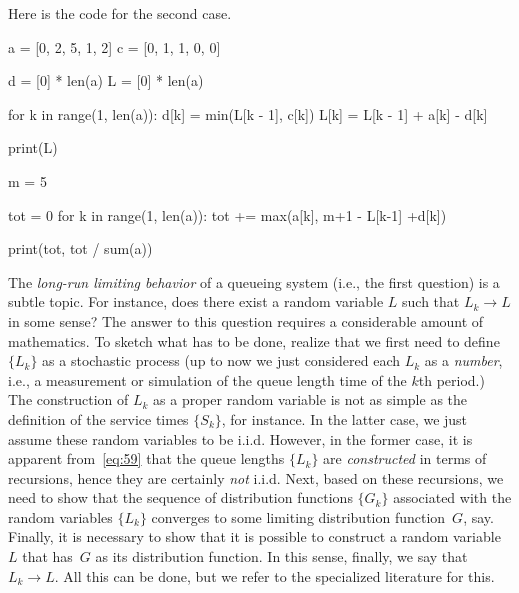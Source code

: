 \documentclass[companion]{subfiles}
\begin{document}
\begin{exercise}
\begin{solution}
Here is the code for the second case. 
\begin{pyconsole}
a = [0, 2, 5, 1, 2]
c = [0, 1, 1, 0, 0]

d = [0] * len(a)
L = [0] * len(a)

for k in range(1, len(a)):
    d[k] = min(L[k - 1], c[k])
    L[k] = L[k - 1] + a[k] - d[k]

print(L)

m = 5

tot = 0
for k in range(1, len(a)):
    tot += max(a[k], m+1 - L[k-1] +d[k])

print(tot, tot / sum(a))
\end{pyconsole}

\end{solution}
\end{exercise}



\begin{remark}\label{rem:em-1}
The \emph{long-run limiting behavior} of a queueing system (i.e., the first question) is a subtle topic.
For instance, does there exist a random variable $L$ such that $L_k\to L$ in some sense?
The answer to this question requires a considerable amount of mathematics.
To sketch what has to be done, realize that we first need to define $\{L_k\}$ as a stochastic process (up to now we just considered each $L_k$ as a \emph{number}, i.e., a measurement or simulation of the queue length time of the $k$th period.)
The construction of $L_k$ as a proper random variable is not as simple as the definition of the service times  $\{S_k\}$, for instance.
In the latter case, we just assume these random variables to be i.i.d.
However, in the former case, it is apparent from~\cref{eq:59} that the queue lengths $\{L_k\}$ are \emph{constructed} in terms of recursions, hence they are certainly \emph{not} i.i.d.
Next, based on these recursions, we need to show that the sequence of distribution functions $\{G_k\}$ associated with the random variables $\{L_k\}$ converges to some limiting distribution function~$G$, say.
Finally, it is necessary to show that it is possible to construct a random variable~$L$ that has~$G$ as its distribution function.
In this sense, finally,  we say that~$L_k \to L$. All this can be done, but we refer to the specialized literature for this. 
\end{remark}


\end{document}
